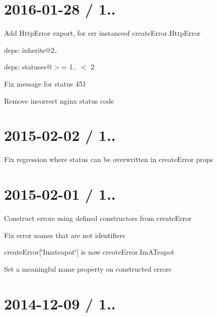 \section*{2016-\/01-\/28 / 1.. }


\begin{DoxyItemize}
\item Add {\ttfamily Http\+Error} export, for {\ttfamily err instanceof create\+Error.\+Http\+Error}
\item deps\+: inherits@2..
\item deps\+: statuses@\textquotesingle{}$>$= 1.. $<$ 2\textquotesingle{}
\begin{DoxyItemize}
\item Fix message for status 451
\item Remove incorrect nginx status code
\end{DoxyItemize}
\end{DoxyItemize}

\section*{2015-\/02-\/02 / 1.. }


\begin{DoxyItemize}
\item Fix regression where status can be overwritten in {\ttfamily create\+Error} {\ttfamily props}
\end{DoxyItemize}

\section*{2015-\/02-\/01 / 1.. }


\begin{DoxyItemize}
\item Construct errors using defined constructors from {\ttfamily create\+Error}
\item Fix error names that are not identifiers
\begin{DoxyItemize}
\item {\ttfamily create\+Error\mbox{[}\char`\"{}\+I\textquotesingle{}mateapot\char`\"{}\mbox{]}} is now {\ttfamily create\+Error.\+Im\+A\+Teapot}
\end{DoxyItemize}
\item Set a meaningful {\ttfamily name} property on constructed errors
\end{DoxyItemize}

\section*{2014-\/12-\/09 / 1.. }


